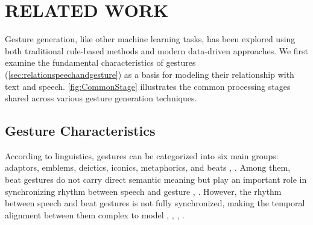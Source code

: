 %
%
%
%
%
%

\section{RELATED WORK}
\label{sec:related_work}


Gesture generation, like other machine learning tasks, has been explored using both traditional rule-based methods and modern data-driven approaches. We first examine the fundamental characteristics of gestures (\autoref{sec:relationspeechandgesture}) as a basis for modeling their relationship with text and speech. \autoref{fig:CommonStage} illustrates the common processing stages shared across various gesture generation techniques.


\subsection{Gesture Characteristics}
\label{sec:relationspeechandgesture}

According to linguistics, gestures can be categorized into six main groups: adaptors, emblems, deictics, iconics, metaphorics, and beats \cite{ekman1969repertoire}, \cite{sebeok2011advances}. Among them, beat gestures do not carry direct semantic meaning but play an important role in synchronizing rhythm between speech and gesture \cite{kipp2005gesture}, \cite{sebeok2011advances}. However, the rhythm between speech and beat gestures is not fully synchronized, making the temporal alignment between them complex to model \cite{mcclave1994gestural}, \cite{bhattacharya2021speech2affectivegestures}, \cite{kucherenko2020gesticulator}, \cite{yoon2020speech}.

